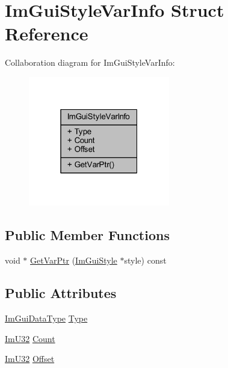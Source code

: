 \hypertarget{struct_im_gui_style_var_info}{}\section{Im\+Gui\+Style\+Var\+Info Struct Reference}
\label{struct_im_gui_style_var_info}


Collaboration diagram for Im\+Gui\+Style\+Var\+Info\+:
\nopagebreak
\begin{figure}[H]
\begin{center}
\leavevmode
\includegraphics[width=175pt]{struct_im_gui_style_var_info__coll__graph}
\end{center}
\end{figure}
\subsection*{Public Member Functions}
\begin{DoxyCompactItemize}
\item 
void $\ast$ \mbox{\hyperlink{struct_im_gui_style_var_info_a92aebc5f0d8b2b43b61dbcaf992b5643}{Get\+Var\+Ptr}} (\mbox{\hyperlink{struct_im_gui_style}{Im\+Gui\+Style}} $\ast$style) const
\end{DoxyCompactItemize}
\subsection*{Public Attributes}
\begin{DoxyCompactItemize}
\item 
\mbox{\hyperlink{imgui_8h_a4cfa8697a3d76722fff83eb18922e9d5}{Im\+Gui\+Data\+Type}} \mbox{\hyperlink{struct_im_gui_style_var_info_a62f42d2bb7b71b7530493e16e622cb81}{Type}}
\item 
\mbox{\hyperlink{imgui_8h_a118cff4eeb8d00e7d07ce3d6460eed36}{Im\+U32}} \mbox{\hyperlink{struct_im_gui_style_var_info_acfab57d23ba575db3595da80989b444e}{Count}}
\item 
\mbox{\hyperlink{imgui_8h_a118cff4eeb8d00e7d07ce3d6460eed36}{Im\+U32}} \mbox{\hyperlink{struct_im_gui_style_var_info_ae900d6a02166d3d0433c18b95aec10e8}{Offset}}
\end{DoxyCompactItemize}


